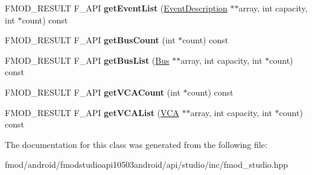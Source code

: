 \begin{DoxyCompactItemize}
\item 
\hypertarget{class_f_m_o_d_1_1_studio_1_1_bank_aa2a53d981ce87a9246fbe4b3b3e7d556}{F\+M\+O\+D\+\_\+\+R\+E\+S\+U\+L\+T F\+\_\+\+A\+P\+I {\bfseries get\+Event\+List} (\hyperlink{class_f_m_o_d_1_1_studio_1_1_event_description}{Event\+Description} $\ast$$\ast$array, int capacity, int $\ast$count) const }\label{class_f_m_o_d_1_1_studio_1_1_bank_aa2a53d981ce87a9246fbe4b3b3e7d556}

\item 
\hypertarget{class_f_m_o_d_1_1_studio_1_1_bank_ad1fb97f7464312cacb36b27b736762d0}{F\+M\+O\+D\+\_\+\+R\+E\+S\+U\+L\+T F\+\_\+\+A\+P\+I {\bfseries get\+Bus\+Count} (int $\ast$count) const }\label{class_f_m_o_d_1_1_studio_1_1_bank_ad1fb97f7464312cacb36b27b736762d0}

\item 
\hypertarget{class_f_m_o_d_1_1_studio_1_1_bank_adb5f1e2bb62341f2c8118354ad8e4c2e}{F\+M\+O\+D\+\_\+\+R\+E\+S\+U\+L\+T F\+\_\+\+A\+P\+I {\bfseries get\+Bus\+List} (\hyperlink{class_f_m_o_d_1_1_studio_1_1_bus}{Bus} $\ast$$\ast$array, int capacity, int $\ast$count) const }\label{class_f_m_o_d_1_1_studio_1_1_bank_adb5f1e2bb62341f2c8118354ad8e4c2e}

\item 
\hypertarget{class_f_m_o_d_1_1_studio_1_1_bank_a4716bc370778f4cdb48ec93cf1f2e5c3}{F\+M\+O\+D\+\_\+\+R\+E\+S\+U\+L\+T F\+\_\+\+A\+P\+I {\bfseries get\+V\+C\+A\+Count} (int $\ast$count) const }\label{class_f_m_o_d_1_1_studio_1_1_bank_a4716bc370778f4cdb48ec93cf1f2e5c3}

\item 
\hypertarget{class_f_m_o_d_1_1_studio_1_1_bank_a2940d5501180f631e33ae37b979bc1c3}{F\+M\+O\+D\+\_\+\+R\+E\+S\+U\+L\+T F\+\_\+\+A\+P\+I {\bfseries get\+V\+C\+A\+List} (\hyperlink{class_f_m_o_d_1_1_studio_1_1_v_c_a}{V\+C\+A} $\ast$$\ast$array, int capacity, int $\ast$count) const }\label{class_f_m_o_d_1_1_studio_1_1_bank_a2940d5501180f631e33ae37b979bc1c3}

\end{DoxyCompactItemize}


The documentation for this class was generated from the following file\+:\begin{DoxyCompactItemize}
\item 
fmod/android/fmodstudioapi10503android/api/studio/inc/fmod\+\_\+studio.\+hpp\end{DoxyCompactItemize}
